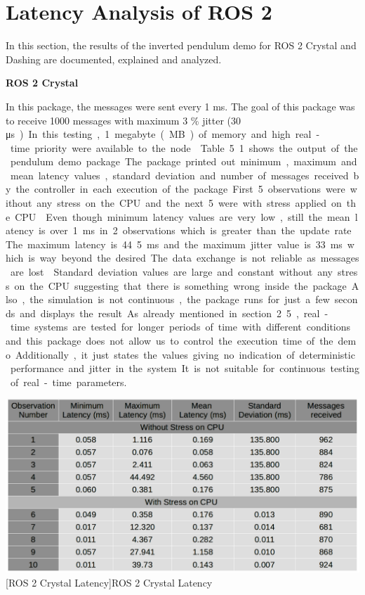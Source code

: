 \documentclass[%
xelatex,
	oneside,		%
	12pt,			%
	parskip=half,	%
	abstracton,
	chapterprefix=true%
    appendixprefix=true]
{scrbook}
\begin{document}
		\section{Latency Analysis of ROS 2}
\vspace*{0.25cm}
In this section, the results of the inverted pendulum demo for ROS 2 Crystal and Dashing are documented, explained and analyzed.
\vspace*{0.25cm}

{\bfseries ROS 2 Crystal}
\vspace*{0.25cm}

In this package, the messages were sent every 1 ms. The goal of this package was to receive 1000 messages with maximum 3 \% jitter (30 \si\micro s). In this testing, 1 megabyte (MB) of memory and high real-time priority were available to the node.

\vspace*{0.2cm}
 Table 5.1 shows the output of the pendulum demo package. The package printed out minimum, maximum and mean latency values, standard deviation and number of messages received by the controller in each execution of the package. First 5 observations were without any stress on the CPU and the next 5 were with stress applied on the CPU.

\vspace*{0.2cm}
Even though minimum latency values are very low, still the mean latency is over 1 ms in 2 observations which is greater than the update rate. The maximum latency is 44.5 ms and the maximum jitter value is 33 ms which is way beyond the desired. The data exchange is not reliable as messages are lost. 
\vspace*{0.2cm}

Standard deviation values are large and constant without any stress on the CPU suggesting that there is something wrong inside the package. Also, the simulation is not continuous, the package runs for just a few seconds and displays the result. As already mentioned in section 2.5, real-time systems are tested for longer periods of time with different conditions and this package does not allow us to control the execution time of the demo. Additionally, it just states the values giving no indication of deterministic performance and jitter in the system.
It is not suitable for continuous testing of real-time parameters.
\begin{center}
\includegraphics[scale=0.38]{fig/ros2crylatency.png}
[ROS 2 Crystal Latency]{ROS 2 Crystal Latency}
\label{tab:ros2crystallatency}
\end{center}
\end{document}
